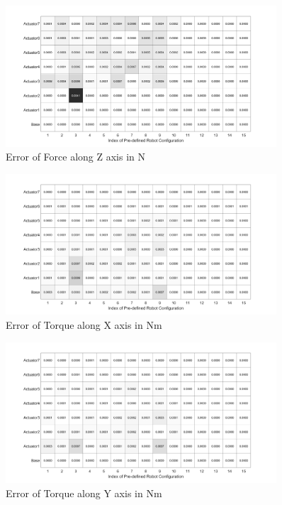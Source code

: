 \begin{figure}[H]
	\begin{center}
		\includegraphics[width=0.9\textwidth]{./images/ForceZError.png}%
		\caption{Error of Force along Z axis in N}
		\label{fig:ForceZError}%
	\end{center}
\end{figure}

\begin{figure}[H]
	\begin{center}
		\includegraphics[width=0.9\textwidth]{./images/TorqueXError.png}%
		\caption{Error of Torque along X axis in Nm}
		\label{fig:TorqueXError}%
	\end{center}
\end{figure}

\begin{figure}[H]
	\begin{center}
		\includegraphics[width=0.9\textwidth]{./images/TorqueYError.png}%
		\caption{Error of Torque along Y axis in Nm}
		\label{fig:TorqueYError}%
	\end{center}
\end{figure}

